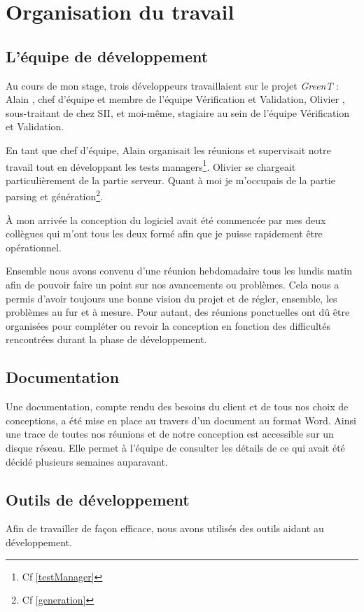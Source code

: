 \chapter{Organisation du travail}
\section{L'équipe de développement}
Au cours de mon stage, trois développeurs travaillaient sur le projet \textit{GreenT} : Alain , chef d’équipe et membre de l’équipe Vérification et Validation, Olivier , sous-traitant de chez SII, et moi-même, stagiaire au sein de l’équipe Vérification et Validation.

En tant que chef d’équipe, Alain  organisait les réunions et supervisait notre travail tout en développant les tests managers\footnote{Cf \ref{testManager}}. Olivier  se chargeait particulièrement de la partie serveur. Quant à moi je m’occupais de la partie parsing et génération\footnote{Cf \ref{generation}}.

À mon arrivée la conception du logiciel avait été commencée par mes deux collègues qui m’ont tous les deux formé afin que je puisse rapidement être opérationnel.

Ensemble nous avons convenu d’une réunion hebdomadaire tous les lundis matin afin de pouvoir faire un point sur nos avancements ou problèmes. Cela nous a permis d’avoir toujours une bonne vision du projet et de régler, ensemble, les problèmes au fur et à mesure. Pour autant, des réunions ponctuelles ont dû être organisées pour compléter ou revoir la conception en fonction des difficultés rencontrées durant la phase de développement.

\section{Documentation}
Une documentation, compte rendu des besoins du client et de tous nos choix de conceptions, a été mise en place au travers d’un document au format Word. Ainsi une
trace de toutes nos réunions et de notre conception est accessible sur un disque réseau. Elle permet à l'équipe de consulter les détails de ce qui avait été décidé plusieurs semaines auparavant.

\section{Outils de développement}
Afin de travailler de façon efficace, nous avons utilisés des outils aidant au développement.


